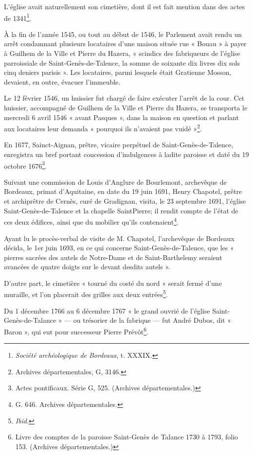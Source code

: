 \documentclass[a4paper,11pt]{book}
\begin{document}
L'église avait naturellement son cimetière, dont il est fait mention dans des actes de 1341\footnote{\textit{Société archéologique de Bordeaux}, t. XXXIX.}.

À la fin de l'année 1545, ou tout au début de 1546, le Parlement avait rendu un arrêt condamnant plusieurs locataires d'une maison située rue « Bouau » à payer à Guilhem de la Ville et Pierre du Hazera, « scindics des fabriqueurs de l'église parroissiale de Saint-Genès-de-Talence, la somme de soixante dix livres dix sols cinq deniers parisis ». Les locataires, parmi lesquels était Gratienne Mosson, devaient, en outre, évacuer l'immeuble.

Le 12 février 1546, un huissier fut chargé de faire exécuter l'arrêt de la cour. Cet huissier, accompagné de Guilhem de la Ville et Pierre du Hazera, se transporta le mercredi 6 avril 1546 « avant Pasques », dans la maison en question et parlant aux locataires leur demanda « pourquoi ils n'avaient pas vuidé »\footnote{Archives départementales, G, 3146.}.

En 1677, Sainct-Aignan, prêtre, vicaire perpétuel de Saint-Genès-de-Talence, enregistra un bref portant concession d'indulgences à ladite paroisse et daté du 19 octobre 1676\footnote{Actes pontificaux. Série G, 525. (Archives départementales.)}.

Suivant une commission de Louis d'Anglure de Bourlemont, archevêque de Bordeaux, primat d'Aquitaine, en date du 19 juin 1691, Henry Chapotel, prêtre et archiprêtre de Cernès, curé de Gradignan, visita, le 23 septembre 1691, l'église Saint-Genès-de-Talence et la chapelle SaintPierre; il rendit compte de l'état de ces deux édifices, ainsi que du mobilier qu'ils contenaient\footnote{G. 646. Archives départementales.}.

Ayant lu le procès-verbal de visite de M. Chapotel, l'archevêque de Bordeaux décida, le 1er juin 1693, en ce qui concerne Saint-Genès-de-Talence, que les « pierres sacrées des autels de Notre-Dame et de Saint-Barthelemy seraient avancées de quatre doigts sur le devant desdits autels ».

D'autre part, le cimetière « tourné du costé du nord » serait fermé d'une muraille, et l'on placerait des grilles aux deux entrées\footnote{\textit{Ibid}.}.

Du 1\ier{} décembre 1766 au 6 décembre 1767 « le grand ouvrié de l'église Saint-Genès-de-Talance » — ou trésorier de la fabrique — fut André Dubos, dit « Baron », qui eut pour successeur Pierre Prévôt\footnote{Livre des comptes de la paroisse Saint-Genès de Talance 1730 à 1793, folio 153. (Archives départementales.)}.
\end{document}

